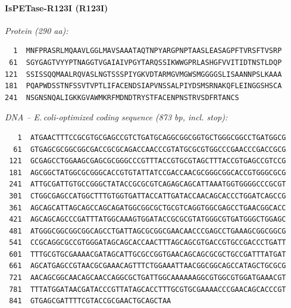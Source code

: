 \documentclass[11pt]{article}
\begin{document}
\paragraph{IsPETase-R123I  (R123I)}
\noindent\textit{Protein (290 aa):}
\begin{verbatim}
  1  MNFPRASRLMQAAVLGGLMAVSAAATAQTNPYARGPNPTAASLEASAGPFTVRSFTVSRP
 61  SGYGAGTVYYPTNAGGTVGAIAIVPGYTARQSSIKWWGPRLASHGFVVITIDTNSTLDQP
121  SSISSQQMAALRQVASLNGTSSSPIYGKVDTARMGVMGWSMGGGGSLISAANNPSLKAAA
181  PQAPWDSSTNFSSVTVPTLIFACENDSIAPVNSSALPIYDSMSRNAKQFLEINGGSHSCA
241  NSGNSNQALIGKKGVAWMKRFMDNDTRYSTFACENPNSTRVSDFRTANCS
\end{verbatim}
\medskip
\noindent\textit{DNA -- E.\,coli-optimized coding sequence (873 bp, incl. stop):}
\begin{verbatim}
   1  ATGAACTTTCCGCGTGCGAGCCGTCTGATGCAGGCGGCGGTGCTGGGCGGCCTGATGGCG
  61  GTGAGCGCGGCGGCGACCGCGCAGACCAACCCGTATGCGCGTGGCCCGAACCCGACCGCG
 121  GCGAGCCTGGAAGCGAGCGCGGGCCCGTTTACCGTGCGTAGCTTTACCGTGAGCCGTCCG
 181  AGCGGCTATGGCGCGGGCACCGTGTATTATCCGACCAACGCGGGCGGCACCGTGGGCGCG
 241  ATTGCGATTGTGCCGGGCTATACCGCGCGTCAGAGCAGCATTAAATGGTGGGGCCCGCGT
 301  CTGGCGAGCCATGGCTTTGTGGTGATTACCATTGATACCAACAGCACCCTGGATCAGCCG
 361  AGCAGCATTAGCAGCCAGCAGATGGCGGCGCTGCGTCAGGTGGCGAGCCTGAACGGCACC
 421  AGCAGCAGCCCGATTTATGGCAAAGTGGATACCGCGCGTATGGGCGTGATGGGCTGGAGC
 481  ATGGGCGGCGGCGGCAGCCTGATTAGCGCGGCGAACAACCCGAGCCTGAAAGCGGCGGCG
 541  CCGCAGGCGCCGTGGGATAGCAGCACCAACTTTAGCAGCGTGACCGTGCCGACCCTGATT
 601  TTTGCGTGCGAAAACGATAGCATTGCGCCGGTGAACAGCAGCGCGCTGCCGATTTATGAT
 661  AGCATGAGCCGTAACGCGAAACAGTTTCTGGAAATTAACGGCGGCAGCCATAGCTGCGCG
 721  AACAGCGGCAACAGCAACCAGGCGCTGATTGGCAAAAAAGGCGTGGCGTGGATGAAACGT
 781  TTTATGGATAACGATACCCGTTATAGCACCTTTGCGTGCGAAAACCCGAACAGCACCCGT
 841  GTGAGCGATTTTCGTACCGCGAACTGCAGCTAA
\end{verbatim}
\bigskip
\end{document}
